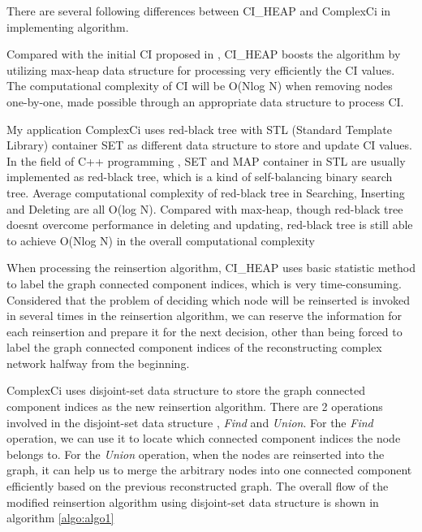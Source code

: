 \documentclass{article}
\begin{document}
	There are several following differences between CI\_HEAP and ComplexCi in implementing algorithm.
	
	\begin{enumerate}
	\begin{item}
		Compared with the initial CI proposed in \cite{morone2015influence}, CI\_HEAP boosts the algorithm by utilizing max-heap data structure for processing very efficiently the CI values. The computational complexity of CI will be O(Nlog N) when removing nodes one-by-one, made possible through an appropriate data structure to process CI. 
		
		My application ComplexCi uses red-black tree with STL (Standard Template Library) container SET as different data structure to store and update CI values. In the field of C++ programming , SET and MAP container in STL are usually implemented as red-black tree, which is a kind of self-balancing binary search tree. Average computational complexity of red-black tree in Searching, Inserting and Deleting are all O(log N). Compared with max-heap, though red-black tree doesn\textquotesingle t overcome performance in deleting and updating, red-black tree is still able to achieve O(Nlog N) in the overall computational complexity 
	\end{item}
	\begin{item}
		When processing the reinsertion algorithm, CI\_HEAP uses basic statistic method to label the graph connected component indices, which is very time-consuming. Considered that the problem of deciding which node will be reinserted is invoked in several times in the reinsertion algorithm, we can reserve the information for each reinsertion and prepare it for the next decision, other than being forced to label the graph connected component indices of the reconstructing complex network halfway from the beginning.
		
		ComplexCi uses disjoint-set data structure to store the graph connected component indices as the new reinsertion algorithm. There are 2 operations involved in the disjoint-set data structure , \textit{Find} and \textit{Union}. For the \textit{Find} operation, we can use it to locate which connected component indices the node belongs to. For the \textit{Union} operation, when the nodes are reinserted into the graph, it can help us to merge the arbitrary nodes into one connected component efficiently based on the previous reconstructed graph. The overall flow of the modified reinsertion algorithm using disjoint-set data structure is shown in algorithm \ref{algo:algo1}


\end{item}
\end{enumerate}
\end{document}
